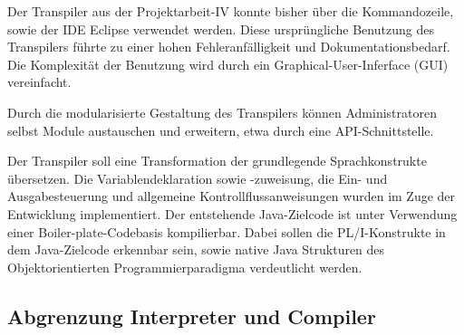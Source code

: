 Der Transpiler aus der Projektarbeit-IV konnte bisher über die Kommandozeile, sowie der IDE Eclipse verwendet werden. Diese ursprüngliche Benutzung des Transpilers führte zu einer hohen Fehleranfälligkeit und Dokumentationsbedarf. Die Komplexität der Benutzung wird durch ein Graphical-User-Inferface (GUI) vereinfacht.

Durch die modularisierte Gestaltung des Transpilers können Administratoren selbst Module austauschen und erweitern, 
etwa durch eine API-Schnittstelle. 


Der Transpiler soll eine Transformation der grundlegende Sprachkonstrukte übersetzen. Die Variablendeklaration sowie -zuweisung, die Ein- und Ausgabesteuerung und allgemeine Kontrollflussanweisungen wurden im Zuge der Entwicklung implementiert. Der entstehende Java-Zielcode ist unter Verwendung einer Boiler-plate-Codebasis kompilierbar. Dabei sollen die PL/I-Konstrukte in dem Java-Zielcode erkennbar sein, sowie native Java Strukturen des Objektorientierten Programmierparadigma verdeutlicht werden.

%
	
 
    \pagebreak

\subsection{Abgrenzung Interpreter und Compiler}
  
